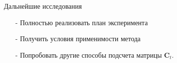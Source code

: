 \documentclass{beamer}
\begin{document}
\begin{frame}{Дальнейшие исследования}
\begin{itemize}
\item[-] Полностью реализовать план эксперимента
\item[-] Получить условия применимости метода
\item[-] Попробовать другие способы подсчета матрицы $\mathbf{C}_t$.
\end{itemize}


\end{frame}
\end{document}
